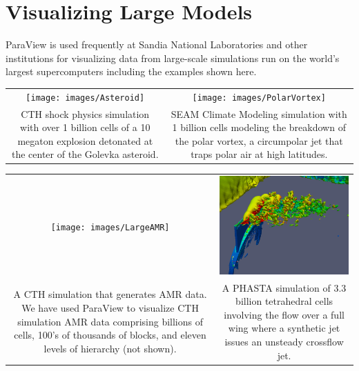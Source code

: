 \chapter{Visualizing Large Models}
\label{chap:VisualizingLargeModels}

ParaView is used frequently at Sandia National Laboratories and other
institutions for visualizing data from large-scale simulations run on the
world's largest supercomputers including the examples shown here.

\begin{inlinefig}
  \begin{tabular}{cc}
    \texttt{[image: images/Asteroid]} &
    \texttt{[image: images/PolarVortex]} \\
    \parbox[t]{0.431\linewidth}{\footnotesize CTH shock physics simulation
      with over 1 billion cells of a 10 megaton explosion detonated at the
      center of the Golevka asteroid.} &
    \parbox[t]{0.469\linewidth}{\footnotesize SEAM Climate Modeling
      simulation with 1 billion cells modeling the breakdown of the polar
      vortex, a circumpolar jet that traps polar air at high latitudes.}
  \end{tabular}

  \begin{tabular}{cc}
    \texttt{[image: images/LargeAMR]} &
    \includegraphics[width=0.426\linewidth]{images/Crossflow} \\
    \parbox[t]{0.474\linewidth}{\footnotesize A CTH simulation that
      generates AMR data.  We have used ParaView to visualize CTH
      simulation AMR data comprising billions of cells, 100's of thousands
      of blocks, and eleven levels of hierarchy (not shown).} &
    \parbox[t]{0.426\linewidth}{\footnotesize A PHASTA simulation of 3.3
      billion tetrahedral cells involving the flow over a full wing where a
    synthetic jet issues an unsteady crossflow jet.}
  \end{tabular}


\end{inlinefig}
